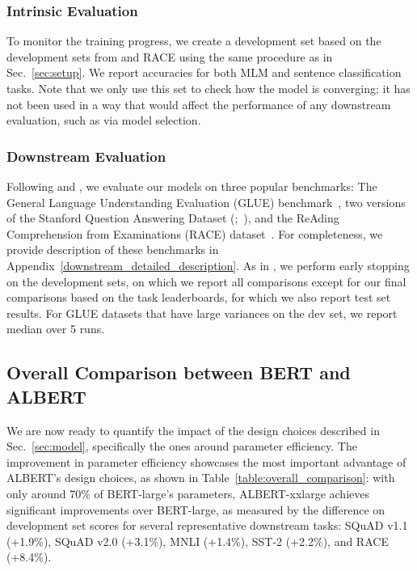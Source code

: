 \subsubsection{Intrinsic Evaluation}
To monitor the training progress, we create a development set based on the development sets from \squad and RACE using the same procedure as in Sec.~\ref{sec:setup}. 
We report accuracies for both MLM and sentence classification tasks. Note that we only use this set to check how the model is converging; it has not been used in a way that would affect the performance of any downstream evaluation, such as via model selection. 


\subsubsection{Downstream Evaluation}
Following \cite{yang2019xlnet} and \cite{liu2019roberta}, we evaluate our models on three popular benchmarks: The General Language Understanding Evaluation (GLUE) benchmark~\citep{wang-etal-2018-glue}, two versions of the Stanford Question Answering Dataset (\squad;~\citealp{rajpurkar-etal-2016-squad,rajpurkar-etal-2018-know}), and the ReAding Comprehension from Examinations  (RACE) dataset~\citep{lai2017race}. 
For completeness, we provide description of these benchmarks in Appendix~\ref{downstream_detailed_description}.
As in \citep{liu2019roberta}, we perform early stopping on the development sets, on which we report all comparisons except for our final comparisons based on the task leaderboards, for which we also report test set results. For GLUE datasets that have large variances on the dev set, we report median over 5 runs.  


\subsection{Overall Comparison between BERT and ALBERT}
We are now ready to quantify the impact of the design choices described in Sec.~\ref{sec:model}, specifically the ones around parameter efficiency.
The improvement in parameter efficiency showcases the most important advantage of ALBERT's design choices, as shown in Table~\ref{table:overall_comparison}: with only around 70\% of BERT-large's parameters, ALBERT-xxlarge achieves significant improvements over BERT-large, as measured by the difference on development set scores for several representative downstream tasks:
SQuAD v1.1 (+1.9\%), SQuAD v2.0 (+3.1\%), MNLI (+1.4\%), SST-2 (+2.2\%), and RACE (+8.4\%).


